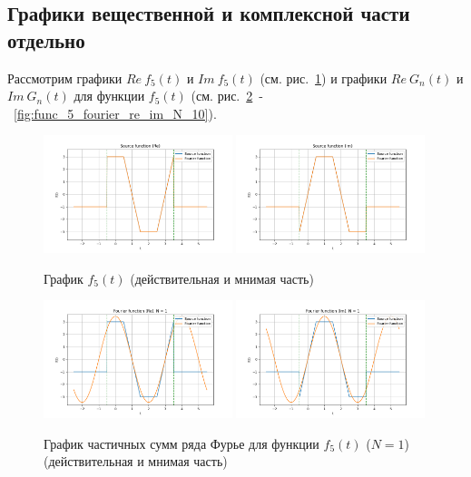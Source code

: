 \subsection{Графики вещественной и комплексной части отдельно}

Рассмотрим графики $Re~f_5(t)$ и $Im~f_5(t)$ (см. рис.~\ref{fig:func_5_re_im}) и графики $Re~G_n(t)$ и $Im~G_n(t)$  для функции $f_5(t)$ (см. рис.~\ref{fig:func_5_fourier_re_im_N_1}~-~\ref{fig:func_5_fourier_re_im_N_10}).

\begin{figure}[ht!]
    \centering
    \includegraphics[width=0.49\textwidth]{media/plots/func_5_real.png}
    \includegraphics[width=0.49\textwidth]{media/plots/func_5_imag.png}
    \caption{График  $f_5(t)$ (действительная и мнимая часть)}
    \label{fig:func_5_re_im}
\end{figure}


\begin{figure}[ht!]
    \centering
    \includegraphics[width=0.49\textwidth]{media/plots/func_5_real_N_1.png}
    \includegraphics[width=0.49\textwidth]{media/plots/func_5_imag_N_1.png}
    \caption{График частичных сумм ряда Фурье для функции $f_5(t)$ ($N = 1$) (действительная и мнимая часть)}
    \label{fig:func_5_fourier_re_im_N_1}
\end{figure}

